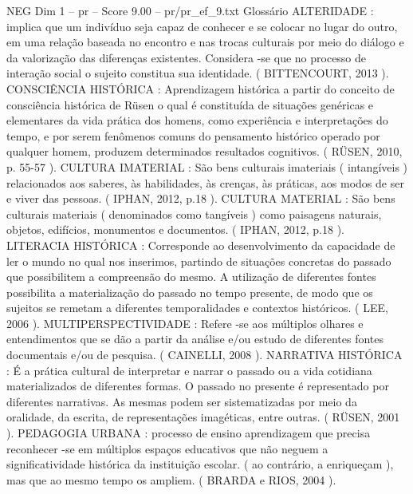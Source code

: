 \begin{textsample}{NEG Dim 1 – pr – Score 9.00 – pr/pr\_ef\_9.txt}  \label{ex:f1_neg_269}
Glossário ALTERIDADE : implica que um indivíduo seja capaz de conhecer e se colocar no lugar do outro, em uma relação baseada no encontro e nas trocas culturais por meio do diálogo e da valorização das diferenças existentes.
Considera -se que no processo de interação social o sujeito constitua sua identidade. ( BITTENCOURT, 2013 ).
CONSCIÊNCIA HISTÓRICA : Aprendizagem histórica a partir do conceito de consciência histórica de Rüsen o qual é constituída de situações genéricas e elementares da vida prática dos homens, como experiência e interpretações do tempo, e por serem fenômenos comuns do pensamento histórico operado por qualquer homem, produzem determinados resultados cognitivos. ( RÜSEN, 2010, p. 55-57 ).
CULTURA IMATERIAL : São bens culturais imateriais ( intangíveis ) relacionados aos saberes, às habilidades, às crenças, às práticas, aos modos de ser e viver das pessoas. ( IPHAN, 2012, p.18 ).
CULTURA MATERIAL : São bens culturais materiais ( denominados como tangíveis ) como paisagens naturais, objetos, edifícios, monumentos e documentos. ( IPHAN, 2012, p.18 ).
LITERACIA HISTÓRICA : Corresponde ao desenvolvimento da capacidade de ler o mundo no qual nos inserimos, partindo de situações concretas do passado que possibilitem a compreensão do mesmo.
A utilização de diferentes fontes possibilita a materialização do passado no tempo presente, de modo que os sujeitos se remetam a diferentes temporalidades e contextos históricos. ( LEE, 2006 ).
MULTIPERSPECTIVIDADE : Refere -se aos múltiplos olhares e entendimentos que se dão a partir da análise e/ou estudo de diferentes fontes documentais e/ou de pesquisa. ( CAINELLI, 2008 ).
NARRATIVA HISTÓRICA : É a prática cultural de interpretar e narrar o passado ou a vida cotidiana materializados de diferentes formas.
O passado no presente é representado por diferentes narrativas.
As mesmas podem ser sistematizadas por meio da oralidade, da escrita, de representações imagéticas, entre outras. ( RÜSEN, 2001 ).
PEDAGOGIA URBANA : processo de ensino aprendizagem que precisa reconhecer -se em múltiplos espaços educativos que não neguem a significatividade histórica da instituição escolar. ( ao contrário, a enriqueçam ), mas que ao mesmo tempo os ampliem. ( BRARDA e RIOS, 2004 ).

\end{textsample}
